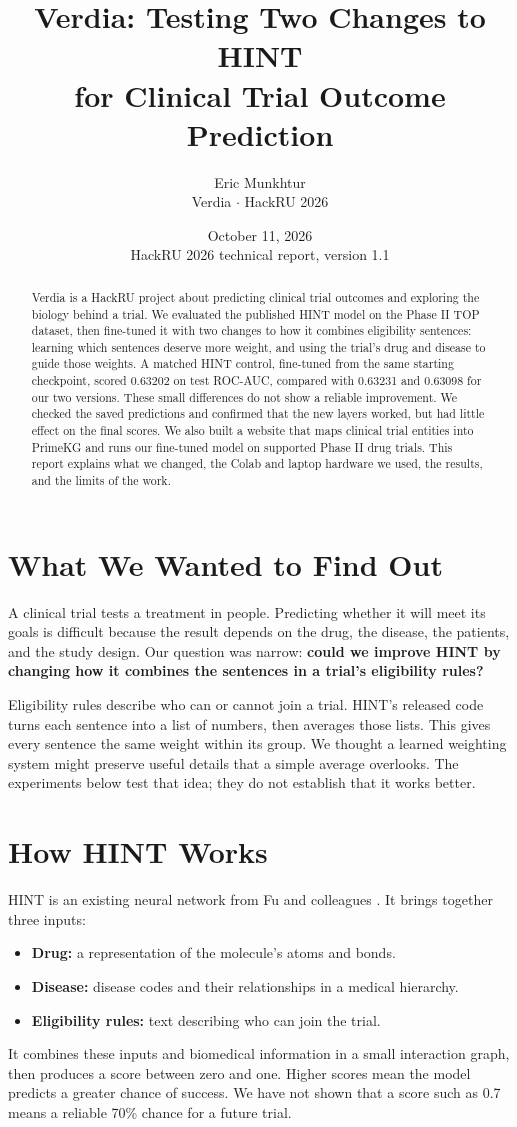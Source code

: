 \documentclass[10pt,letterpaper]{article}
\title{\textbf{Verdia: Testing Two Changes to HINT\\for Clinical Trial Outcome Prediction}}
\author{Eric Munkhtur\\\small Verdia $\cdot$ HackRU 2026}
\date{October 11, 2026\\\small HackRU 2026 technical report, version 1.1}
\begin{document}
\maketitle
\begin{abstract}
Verdia is a HackRU project about predicting clinical trial outcomes and exploring the biology behind a trial. We evaluated the published HINT model on the Phase II TOP dataset, then fine-tuned it with two changes to how it combines eligibility sentences: learning which sentences deserve more weight, and using the trial's drug and disease to guide those weights. A matched HINT control, fine-tuned from the same starting checkpoint, scored 0.63202 on test ROC-AUC, compared with 0.63231 and 0.63098 for our two versions. These small differences do not show a reliable improvement. We checked the saved predictions and confirmed that the new layers worked, but had little effect on the final scores. We also built a website that maps clinical trial entities into PrimeKG and runs our fine-tuned model on supported Phase II drug trials. This report explains what we changed, the Colab and laptop hardware we used, the results, and the limits of the work.
\end{abstract}

\section{What We Wanted to Find Out}
A clinical trial tests a treatment in people. Predicting whether it will meet its goals is difficult because the result depends on the drug, the disease, the patients, and the study design. Our question was narrow: \textbf{could we improve HINT by changing how it combines the sentences in a trial's eligibility rules?}

Eligibility rules describe who can or cannot join a trial. HINT's released code turns each sentence into a list of numbers, then averages those lists. This gives every sentence the same weight within its group. We thought a learned weighting system might preserve useful details that a simple average overlooks. The experiments below test that idea; they do not establish that it works better.

\section{How HINT Works}
HINT is an existing neural network from Fu and colleagues \cite{hint,hintcode}. It brings together three inputs:
\begin{itemize}
\item \textbf{Drug:} a representation of the molecule's atoms and bonds.
\item \textbf{Disease:} disease codes and their relationships in a medical hierarchy.
\item \textbf{Eligibility rules:} text describing who can join the trial.
\end{itemize}
It combines these inputs and biomedical information in a small interaction graph, then produces a score between zero and one. Higher scores mean the model predicts a greater chance of success. We have not shown that a score such as 0.7 means a reliable 70\% chance for a future trial.
\end{document}
